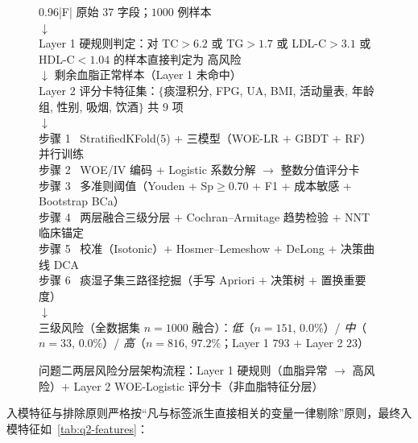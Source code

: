 \documentclass{MathorCupmodeling}
\begin{document}
\begin{figure}[htbp]
\centering
\small
\begin{tabularx}{0.96\linewidth}{|F|}
\hline
原始 $37$ 字段；$1000$ 例样本 \\ \hline
$\downarrow$ \\ \hline
Layer 1 硬规则判定：对 TC$>6.2$ 或 TG$>1.7$ 或 LDL-C$>3.1$ 或 HDL-C$<1.04$ 的样本直接判定为 高风险 \\ \hline
$\downarrow$ 剩余血脂正常样本（Layer 1 未命中）\\ \hline
Layer 2 评分卡特征集：$\{$痰湿积分, FPG, UA, BMI, 活动量表, 年龄组, 性别, 吸烟, 饮酒$\}$ 共 $9$ 项 \\ \hline
$\downarrow$ \\ \hline
步骤 1~ StratifiedKFold($5$) $+$ 三模型（WOE-LR $+$ GBDT $+$ RF）并行训练 \\ \hline
步骤 2~ WOE/IV 编码 + Logistic 系数分解 $\to$ 整数分值评分卡 \\ \hline
步骤 3~ 多准则阈值（Youden + Sp$\ge 0.70$ + F1 + 成本敏感 + Bootstrap BCa）\\ \hline
步骤 4~ 两层融合三级分层 $+$ Cochran--Armitage 趋势检验 $+$ NNT 临床锚定 \\ \hline
步骤 5~ 校准（Isotonic）$+$ Hosmer--Lemeshow $+$ DeLong $+$ 决策曲线 DCA \\ \hline
步骤 6~ 痰湿子集三路径挖掘（手写 Apriori $+$ 决策树 $+$ 置换重要度）\\ \hline
$\downarrow$ \\ \hline
三级风险（全数据集 $n=1000$ 融合）：\emph{低}（$n=151$, $0.0\%$）/ \emph{中}（$n=33$, $0.0\%$）/ \emph{高}（$n=816$, $97.2\%$；Layer 1 $793$ $+$ Layer 2 $23$）\\ \hline
\end{tabularx}
\caption{问题二两层风险分层架构流程：Layer 1 硬规则（血脂异常 $\to$ 高风险）$+$ Layer 2 WOE-Logistic 评分卡（非血脂特征分层）}\label{fig:q2-flow}
\end{figure}

入模特征与排除原则严格按``凡与标签派生直接相关的变量一律剔除''原则，最终入模特征如~\cref{tab:q2-features}：
\end{document}
